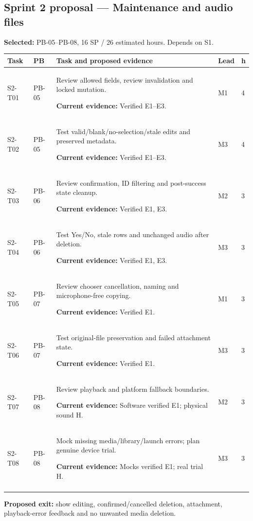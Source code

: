 \documentclass[11pt,a4paper]{article}
\newcommand{\sprinttask}[6]{#1 & #2 & #3\par\smallskip\textbf{Current evidence:} #6 & #4 & #5\\\addlinespace}
\begin{document}
\subsection{Sprint 2 proposal --- Maintenance and audio files}
\textbf{Selected:} PB-05--PB-08, 16 SP / 26 estimated hours. Depends on S1.
\begingroup\small
\begin{longtable}{L{1.3cm}L{1.2cm}L{8.2cm}L{1.1cm}L{0.8cm}}
\toprule\textbf{Task} & \textbf{PB} & \textbf{Task and proposed evidence} & \textbf{Lead} & \textbf{h}\\\midrule\endhead
\sprinttask{S2-T01}{PB-05}{Review allowed fields, review invalidation and locked mutation.}{M1}{4}{Verified E1--E3.}
\sprinttask{S2-T02}{PB-05}{Test valid/blank/no-selection/stale edits and preserved metadata.}{M3}{4}{Verified E1--E3.}
\sprinttask{S2-T03}{PB-06}{Review confirmation, ID filtering and post-success state cleanup.}{M2}{3}{Verified E1, E3.}
\sprinttask{S2-T04}{PB-06}{Test Yes/No, stale rows and unchanged audio after deletion.}{M3}{3}{Verified E1, E3.}
\sprinttask{S2-T05}{PB-07}{Review chooser cancellation, naming and microphone-free copying.}{M1}{3}{Verified E1.}
\sprinttask{S2-T06}{PB-07}{Test original-file preservation and failed attachment state.}{M3}{3}{Verified E1.}
\sprinttask{S2-T07}{PB-08}{Review playback and platform fallback boundaries.}{M2}{3}{Software verified E1; physical sound H.}
\sprinttask{S2-T08}{PB-08}{Mock missing media/library/launch errors; plan genuine device trial.}{M3}{3}{Mocks verified E1; real trial H.}
\bottomrule\end{longtable}\endgroup
\textbf{Proposed exit:} show editing, confirmed/cancelled deletion, attachment,
playback-error feedback and no unwanted media deletion.
\end{document}
